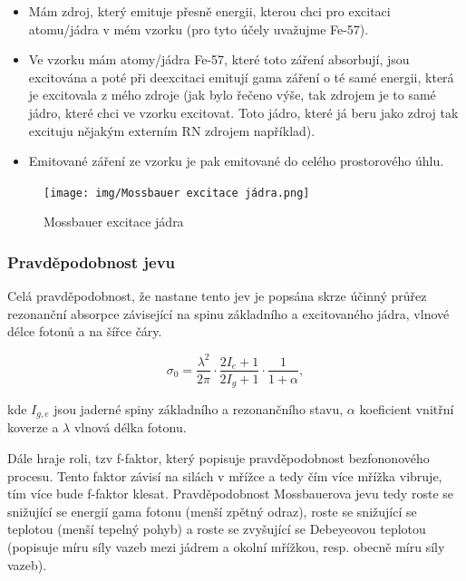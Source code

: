 \begin{itemize}
    \item Mám zdroj, který emituje přesně energii, kterou chci pro excitaci atomu/jádra v mém vzorku (pro tyto účely uvažujme Fe-57).
    \item Ve vzorku mám atomy/jádra Fe-57, které toto záření absorbují, jsou excitována a poté při deexcitaci emitují gama záření o té samé energii, která je excitovala z mého zdroje (jak bylo řečeno výše, tak zdrojem je to samé jádro, které chci ve vzorku excitovat. Toto jádro, které já beru jako zdroj tak excituju nějakým externím RN zdrojem například).
    \item Emitované záření ze vzorku je pak emitované do celého prostorového úhlu.
\end{itemize}

\begin{figure}[H]
    \centering
    \texttt{[image: img/Mossbauer excitace jádra.png]}
    \caption{Mossbauer excitace jádra}
\end{figure}

\subsubsection{Pravděpodobnost jevu}

Celá pravděpodobnost, že nastane tento jev je popsána skrze účinný průřez rezonanční absorpce závisející na spinu základního a excitovaného jádra, vlnové délce fotonů a na šířce čáry.


$$\sigma_0 = \dfrac{\lambda^2}{2\pi} \cdot \dfrac{2I_e + 1}{2I_g +1} \cdot \dfrac{1}{1+\alpha},$$

kde $I_{g,e}$ jsou jaderné spiny základního a rezonančního stavu, $\alpha$ koeficient vnitřní koverze a $\lambda$ vlnová délka fotonu.
 
 
Dále hraje roli, tzv f-faktor, který popisuje pravděpodobnost bezfononového procesu. Tento faktor závisí na silách v mřížce a tedy čím více mřížka vibruje, tím více bude f-faktor klesat. Pravděpodobnost Mossbauerova jevu tedy roste se snižující se energií gama fotonu (menší zpětný odraz), roste se snižující se teplotou (menší tepelný pohyb) a roste se zvyšující se Debeyeovou teplotou (popisuje míru síly vazeb mezi jádrem a okolní mřížkou, resp. obecně míru síly vazeb).
 
